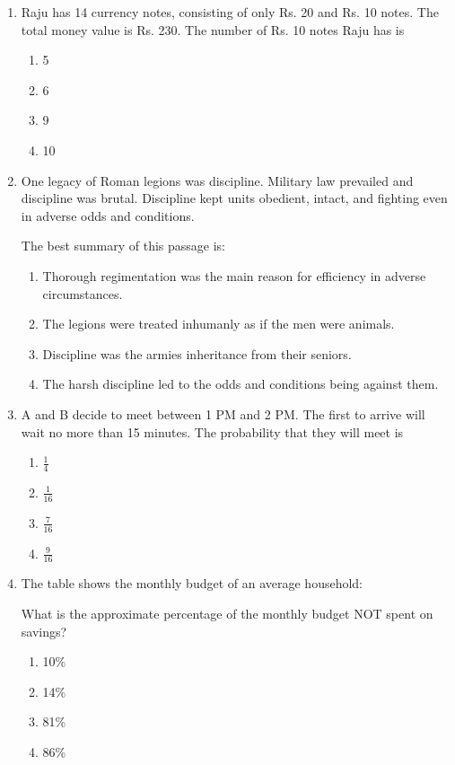 \documentclass[journal]{IEEEtran}
\numberwithin{equation}{enumi}
\numberwithin{figure}{enumi}
\begin{document}
\begin{enumerate}
\item
Raju has 14 currency notes, consisting of only Rs. 20 and Rs. 10 notes. The total money value is Rs. 230. The number of Rs. 10 notes Raju has is
\hfill{}
\begin{multicols}{4}
\begin{enumerate}
\item 5
\item 6
\item 9
\item 10
\end{enumerate}
\end{multicols}

\item
One legacy of Roman legions was discipline. Military law prevailed and discipline was brutal. Discipline kept units obedient, intact, and fighting even in adverse odds and conditions.

The best summary of this passage is:
\hfill{}
\begin{multicols}{2}
\begin{enumerate}
\item Thorough regimentation was the main reason for efficiency in adverse circumstances.
\item The legions were treated inhumanly as if the men were animals.
\item Discipline was the armies inheritance from their seniors.
\item The harsh discipline led to the odds and conditions being against them.
\end{enumerate}
\end{multicols}

\item
A and B decide to meet between 1 PM and 2 PM. The first to arrive will wait no more than 15 minutes. The probability that they will meet is
\hfill{}
\begin{multicols}{4}
\begin{enumerate}
\item \(\frac{1}{4}\)
\item \(\frac{1}{16}\)
\item \(\frac{7}{16}\)
\item \(\frac{9}{16}\)
\end{enumerate}
\end{multicols}

\item
The table shows the monthly budget of an average household:



What is the approximate percentage of the monthly budget NOT spent on savings?

\hfill{}
\begin{multicols}{4}
\begin{enumerate}
\item 10\%
\item 14\%
\item 81\%
\item 86\%
\end{enumerate}
\end{multicols}

\end{enumerate}
\end{document}
